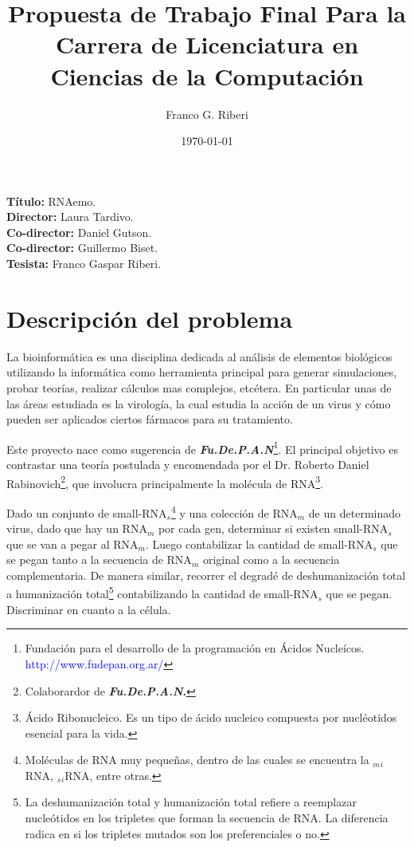 \documentclass[12pt,a4paper]{article}
\begin{document}
 

\title{Propuesta de Trabajo Final Para la Carrera de Licenciatura en Ciencias de la Computación}
		\vskip 2cm
\author{Franco G. Riberi}
		\vskip 2cm
\date{\today} 	

\maketitle

\noindent \textbf{Título:} RNAemo. \\
\vskip 0.01cm
\noindent \textbf{Director:} Laura Tardivo.\\ 
\vskip 0.01cm
\noindent \textbf{Co-director:}  Daniel Gutson.\\
\vskip 0.01cm
\noindent \textbf{Co-director:}  Guillermo Biset.\\
\vskip 0.01cm
\noindent \textbf{Tesista:} Franco Gaspar Riberi. \\

\section{Descripción del problema}

\par La bioinformática es una disciplina dedicada al análisis de elementos biológicos utilizando la
informática como herramienta principal para generar simulaciones, probar teorías,  realizar cálculos mas complejos, etcétera. En particular unas de las áreas estudiada es la virología, la cual estudia la acción de un virus y cómo pueden ser aplicados ciertos fármacos para su tratamiento. 

\par Este proyecto nace como sugerencia de \textbf{\textit{Fu.De.P.A.N}}\footnote{Fundación para el desarrollo de la programación en Ácidos Nucleícos. \textcolor{blue}{http://www.fudepan.org.ar/}}. El principal objetivo es contrastar una teoría postulada y encomendada por el Dr. Roberto Daniel Rabinovich\footnote{Colaborardor de \textbf{\textit{Fu.De.P.A.N}.}}, que involucra principalmente la molécula de RNA\footnote{Ácido Ribonucleico. Es un tipo de ácido nucleico compuesta por nucléotidos esencial para la vida.}.

\par Dado un conjunto de small-RNA$_s$\footnote{Moléculas de RNA muy pequeñas, dentro de las cuales se encuentra la $_m$$_i$RNA, $_s$$_i$RNA, entre otras.} y una colección de RNA$_m$ de un determinado virus, dado que hay un RNA$_m$ por cada gen, determinar si existen small-RNA$_s$ que se van a pegar al RNA$_m$. Luego contabilizar la cantidad de small-RNA$_s$ que se pegan tanto a la secuencia de RNA$_m$ original como a la secuencia complementaria. De manera similar, recorrer el degradé de deshumanización total a humanización total\footnote{La deshumanización total y humanización total refiere a reemplazar nucleótidos en los tripletes que forman la secuencia de RNA. La diferencia radica en si los tripletes mutados son los preferenciales o no.} contabilizando la cantidad de small-RNA$_s$ que se pegan. Discriminar en cuanto a la célula.
\end{document}
